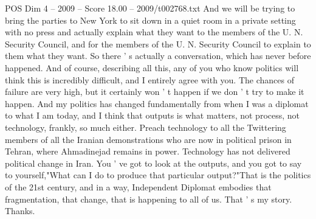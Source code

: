 \begin{textsample}{POS Dim 4 – 2009 – Score 18.00 – 2009/t002768.txt}
And we will be trying to bring the parties to New York to sit down in a quiet room in a private setting with no press and actually explain what they want to the members of the U.
N.
Security Council, and for the members of the U.
N.
Security Council to explain to them what they want.
So there ' s actually a conversation, which has never before happened.
And of course, describing all this, any of you who know politics will think this is incredibly difficult, and I entirely agree with you.
The chances of failure are very high, but it certainly won ' t happen if we don ' t try to make it happen.
And my politics has changed fundamentally from when I was a diplomat to what I am today, and I think that outputs is what matters, not process, not technology, frankly, so much either.
Preach technology to all the Twittering members of all the Iranian demonstrations who are now in political prison in Tehran, where Ahmadinejad remains in power.
Technology has not delivered political change in Iran.
You ' ve got to look at the outputs, and you got to say to yourself,"What can I do to produce that particular output?"That is the politics of the 21st century, and in a way, Independent Diplomat embodies that fragmentation, that change, that is happening to all of us.
That ' s my story.
Thanks.

\end{textsample}
